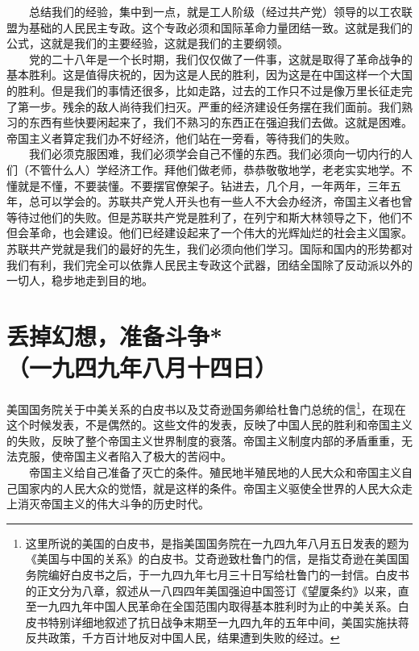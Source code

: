 \documentclass[cn,11pt,chinese]{elegantbook}
\def\myformat#1{\hfil\hfil #1}
\begin{document}
　　总结我们的经验，集中到一点，就是工人阶级（经过共产党）领导的以工农联盟为基础的人民民主专政。这个专政必须和国际革命力量团结一致。这就是我们的公式，这就是我们的主要经验，这就是我们的主要纲领。\\
　　党的二十八年是一个长时期，我们仅仅做了一件事，这就是取得了革命战争的基本胜利。这是值得庆祝的，因为这是人民的胜利，因为这是在中国这样一个大国的胜利。但是我们的事情还很多，比如走路，过去的工作只不过是像万里长征走完了第一步。残余的敌人尚待我们扫灭。严重的经济建设任务摆在我们面前。我们熟习的东西有些快要闲起来了，我们不熟习的东西正在强迫我们去做。这就是困难。帝国主义者算定我们办不好经济，他们站在一旁看，等待我们的失败。\\
　　我们必须克服困难，我们必须学会自己不懂的东西。我们必须向一切内行的人们（不管什么人）学经济工作。拜他们做老师，恭恭敬敬地学，老老实实地学。不懂就是不懂，不要装懂。不要摆官僚架子。钻进去，几个月，一年两年，三年五年，总可以学会的。苏联共产党人开头也有一些人不大会办经济，帝国主义者也曾等待过他们的失败。但是苏联共产党是胜利了，在列宁和斯大林领导之下，他们不但会革命，也会建设。他们已经建设起来了一个伟大的光辉灿烂的社会主义国家。苏联共产党就是我们的最好的先生，我们必须向他们学习。国际和国内的形势都对我们有利，我们完全可以依靠人民民主专政这个武器，团结全国除了反动派以外的一切人，稳步地走到目的地。\\
\newpage\section*{\myformat{丢掉幻想，准备斗争*}\\\myformat{（一九四九年八月十四日）}}
美国国务院关于中美关系的白皮书以及艾奇逊国务卿给杜鲁门总统的信\footnote[1]{ 这里所说的美国的白皮书，是指美国国务院在一九四九年八月五日发表的题为《美国与中国的关系》的白皮书。艾奇逊致杜鲁门的信，是指艾奇逊在美国国务院编好白皮书之后，于一九四九年七月三十日写给杜鲁门的一封信。白皮书的正文分为八章，叙述从一八四四年美国强迫中国签订《望厦条约》以来，直至一九四九年中国人民革命在全国范围内取得基本胜利时为止的中美关系。白皮书特别详细地叙述了抗日战争末期至一九四九年的五年中间，美国实施扶蒋反共政策，千方百计地反对中国人民，结果遭到失败的经过。}，在现在这个时候发表，不是偶然的。这些文件的发表，反映了中国人民的胜利和帝国主义的失败，反映了整个帝国主义世界制度的衰落。帝国主义制度内部的矛盾重重，无法克服，使帝国主义者陷入了极大的苦闷中。\\
　　帝国主义给自己准备了灭亡的条件。殖民地半殖民地的人民大众和帝国主义自己国家内的人民大众的觉悟，就是这样的条件。帝国主义驱使全世界的人民大众走上消灭帝国主义的伟大斗争的历史时代。\\
\end{document}
